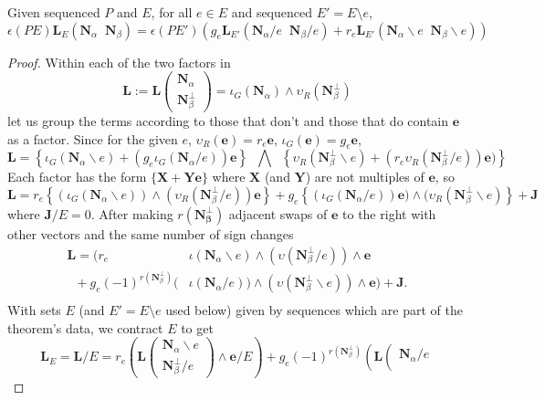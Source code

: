 \documentclass[Unicode]{cedram-alco}
\newcommand{\ext}[1]{\ensuremath{\mathbf{#1}}}
\newcommand{\eNal}{\ensuremath{\ext{N}_{\alpha}}}
\newcommand{\eNbePe}{\ensuremath{\ext{N}_{\beta}^{\perp}}}
\newcommand{\eNbe}{\ensuremath{\ext{N}_\beta}}
\newcommand{\Is}{\ensuremath{\iota}}
\newcommand{\Vs}{\ensuremath{\upsilon}}
\newcommand{\extLHorSub}[3]{\ext{L}_{#1}\left(  {#2}\;\; {#3}  \right)}
\begin{document}
\begin{theo}
  Given sequenced $P$ and $E$, for all $e\in E$ and sequenced $E'=E\setminus e$,
  \begin{equation}\label{delecontrequation}
     \epsilon(PE)\extLHorSub{E}{\eNal}{\eNbe}=
      \epsilon(PE')
      \left(
      g_e\extLHorSub{E'}{\eNal/e}{\eNbe/e} +
      r_e\extLHorSub{E'}{\eNal\backslash e}{\eNbe\backslash e}\right)
  \end{equation}
\end{theo}
\begin{proof}
Within each of the two factors in
  \[
   \ext{L} := \ext{L}\left( \begin{array}{c} \eNal\\ \eNbePe \end{array} \right)
=\Is_G(\eNal)\wedge\Vs_R(\eNbePe)
  \]
let us group the terms according to those that don't and those that do
contain $\ext{e}$ as a factor.   Since for the given $e$, 
  $\Vs_R(\ext{e})=r_e\ext{e}$, $\Is_G(\ext{e})=g_e\ext{e}$,
\[
\ext{L} =
\left\{\Is_G(\eNal \backslash e) + (g_e\Is_G(\eNal/e))\ext{e}\right\}
\;\;\bigwedge\;\;
\left\{\Vs_R(\eNbePe\backslash e) + (r_e\Vs_R(\eNbePe/e))\ext{e})\right\}  
\]
Each factor has the form $\{\ext{X} + \ext{Y}\ext{e}\}$ where
$\ext{X}$ (and $\ext{Y}$) are not multiples of $\ext{e}$, so
\[
\ext{L}=
r_e\left\{ (\Is_G(\eNal\backslash e))\wedge (\Vs_R(\eNbePe/e))\ext{e} \right\}  +
g_e\left\{ (\Is_G(\eNal/e))\ext{e})  \wedge (\Vs_R(\eNbePe\backslash e)\right\}
+\ext{J}
\]
where $\ext{J}/E = 0$.
After making $r(\ext{N_\beta^\perp})$ adjacent swaps of $\ext{e}$ to the right with other
vectors and the same number of sign changes
\[
\begin{split} 
   \ext{L} = \Big( r_e  \;\;\; \;\;\;\;\;\;\;\;\;\;\;\;\;\; & \Is(\eNal\backslash e)  \wedge (\Vs(\eNbePe/e))      \wedge  \ext{e} \\
   \;\;+ g_e (-1)^{r(\eNbePe)} ( & \Is(\eNal/e))\wedge(\Vs(\eNbePe\backslash e))   \wedge  \ext{e}\Big)
+\ext{J}.\\
\end{split}
\]
With sets $E$ (and $E'=E\setminus e$ used below) given by sequences
which are part of the theorem's data, we contract $E$ to get
\[
\ext{L}_E=\ext{L}/E = r_e\left(\ext{L}\left(\begin{array}{c} \eNal\backslash e \\
    \eNbePe/e  \end{array} \right)  \wedge \ext{e} /E \right) +
   g_e(-1)^{r(\eNbePe)}\left(\ext{L}\left(\begin{array}{c} \eNal /e \\

\end{array}\]
\end{proof}
\end{document}
